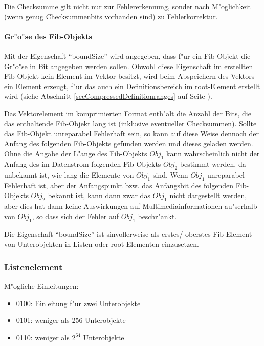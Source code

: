 Die Checksumme gilt nicht nur zur Fehlererkennung, sonder nach M"oglichkeit (wenn genug Checksummenbits vorhanden sind) zu Fehlerkorrektur.





\paragraph{Gr"o"se des Fib-Objekts}
\label{secCompressedBoundSize}

Mit der Eigenschaft ``boundSize'' wird angegeben, dass f"ur ein Fib-Objekt die Gr"o"se in Bit angegeben werden sollen. Obwohl diese Eigenschaft im erstellten Fib-Objekt kein Element im Vektor besitzt, wird beim Abspeichern des Vektors ein Element erzeugt, f"ur das auch ein Definitionsbereich im root-Element erstellt wird (siehe Abschnitt \ref{secCompressedDefinitionranges} auf Seite \pageref{secCompressedDefinitionranges}).

Das Vektorelement im komprimierten Format enth"alt die Anzahl der Bits, die das enthaltende Fib-Objekt lang ist (inklusive eventueller Checksummen). Sollte das Fib-Objekt unreparabel Fehlerhaft sein, so kann auf diese Weise dennoch der Anfang des folgenden Fib-Objekts gefunden werden und dieses geladen werden. Ohne die Angabe der L"ange des Fib-Objekts $Obj_1$ kann wahrscheinlich nicht der Anfang des im Datenstrom folgenden Fib-Objekts $Obj_2$ bestimmt werden, da unbekannt ist, wie lang die Elemente von $Obj_1$ sind. Wenn $Obj_1$ unreparabel Fehlerhaft ist, aber der Anfangspunkt bzw. das Anfangsbit des folgenden Fib-Objekts $Obj_2$ bekannt ist, kann dann zwar das $Obj_1$ nicht dargestellt werden, aber dies hat dann keine Auswirkungen auf Multimediainformationen au"serhalb von $Obj_1$, so dass sich der Fehler auf $Obj_1$ beschr"ankt.

Die Eigenschaft ``boundSize'' ist sinvollerweise als erstes/ oberstes Fib-Element von Unterobjekten in Listen oder root-Elementen einzusetzen.




\subsubsection{Listenelement}

M"ogliche Einleitungen:
\begin{itemize}
 \item 0100: Einleitung f"ur zwei Unterobjekte
 \item 0101: weniger als 256 Unterobjekte
 \item 0110: weniger als $2^{64}$ Unterobjekte
\end{itemize}


